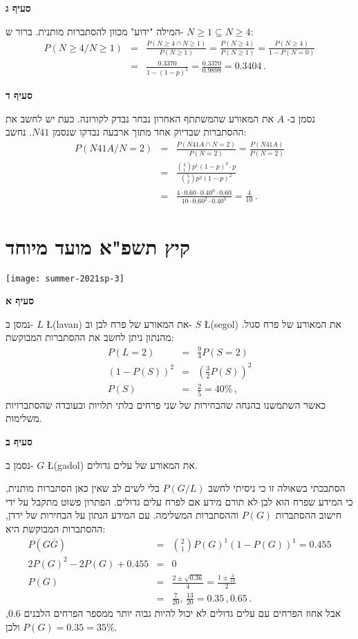 \textbf{סעיף ג}

המילה "ידוע" מכוון להסתברות מותנית. ברור ש-%
$N\geq 1\subseteq N\geq 4$:
\begin{eqnarray*}
P(N\geq 4 / N\geq 1)&=&\frac{P(N\geq 4 \cap N\geq 1)}{P(N\geq 1)}=\frac{P(N\geq 4)}{P(N\geq 1)}=\frac{P(N\geq 4)}{1-P(N=0)}\\
&=& \frac{0.3370}{1-(1-p)^5}=\frac{0.3370}{0.9898}=0.3404\,.
\end{eqnarray*}

\textbf{סעיף ד}

נסמן ב-%
$A$
את המאורע שהמשתתף האחרון נבחר נבדק לקורונה. כעת יש לחשב את ההסתברות שבדיוק אחד מתוך ארבעה נבדקו שנסמן
$N41$.
נחשב:
\begin{eqnarray*}
P(N41A / N= 2)&=& \frac{P(N41A \cap N=2)}{P(N=2)}= \frac{P(N41A)}{P(N=2)}\\
&=&\frac{{4\choose 1}p^1(1-p)^3\cdot p}{{5\choose 2}p^2(1-p)^2}\\
&=&\frac{4\cdot 0.60\cdot 0.40^3\cdot 0.60}{10\cdot 0.60^2\cdot 0.40^3}=\frac{4}{10}\,.
\end{eqnarray*}


\newpage

\section{קיץ תשפ"א מועד מיוחד}

\begin{center}
\texttt{[image: summer-2021sp-3]}
\end{center}

\textbf{סעיף א}

נמסן ב-%
$L$ \L{(lavan)}
את המאורע של פרח לבן וב-%
$S$ \L{(segol)}
את המאורע של פרח סגול. מהנתון ניתן לחשב את ההסתברות המבוקשת:
\begin{eqnarray*}
P(L=2)&=&\frac{9}{4}P(S=2)\\[6pt]
(1-P(S))^2&=&\left(\frac{3}{2}P(S)\right)^2\\[6pt]
P(S)&=&\frac{2}{5}=40\%\,,
\end{eqnarray*}
כאשר השתמשנו בהנחה שהבחירות של שני פרחים בלתי תלויות ובעובדה שהסתברויות משלימות.

\textbf{סעיף ב}

נסמן ב-%
$G$ \L{(gadol)}
את המאורע של עלים גדולים.

הסתבכתי בשאולה זו כי ניסיתי לחשב 
$P(G/L)$
בלי לשים לב שאין כאן הסתברות מותנית, כי המידע שפרח הוא לבן לא תורם  מידע אם לפרח עלים גדולים. הפתרון פשוט מתקבל על ידי חישוב ההסתברות 
$P(G)$
וההסתברות המשלימה. עם המידע הנתון על הבחירות של ירדן, ההסתברות המבוקשת היא:
\begin{eqnarray*}
P(G\overline{G})&=&{2\choose 1}P(G)^1(1-P(G))^1=0.455\\
2P(G)^2 - 2P(G) + 0.455&=&0\\
P(G)&=&\frac{2\pm\sqrt{0.36}}{4}=\frac{1\pm\frac{3}{10}}{2}\\
&=&\frac{7}{20},\,\frac{13}{20}=0.35\,,0.65\,.
\end{eqnarray*}
אבל אחוז הפרחים עם עלים גדולים לא יכול להיות גבוה יותר ממספר הפרחים הלבנים
$0.6$,
ולכן
$P(G)=0.35=35\%$.

